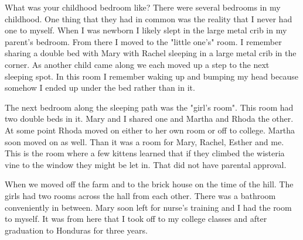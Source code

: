 What was your childhood bedroom like?
There were several bedrooms in my childhood.
One thing that they had in common was the reality that I never had one to myself.
When I was newborn I likely slept in the large metal crib in my parent's bedroom.
From there I moved to the "little one's" room.
I remember sharing a double bed with Mary with Rachel sleeping in a large metal crib in the corner.
As another child came along we each moved up a step to the next sleeping spot.
In this room I remember waking up and bumping my head because somehow I ended up under the bed rather than in it.

The next bedroom along the sleeping path was the "girl's room".
This room had two double beds in it.
Mary and I shared one and Martha and Rhoda the other.
At some point Rhoda moved on either to her own room or off to college.
Martha soon moved on as well.
Than it was a room for Mary, Rachel, Esther and me.
This is the room where a few kittens learned that if they climbed the wisteria vine to the window they might be let in.
That did not have parental approval.

When we moved off the farm and to the brick house on the time of the hill.
The girls had two rooms across the hall from each other.
There was a bathroom conveniently in between.
Mary soon left for nurse's training and I had the room to myself.
It was from here that I took off to my college classes and after graduation to Honduras for three years.







